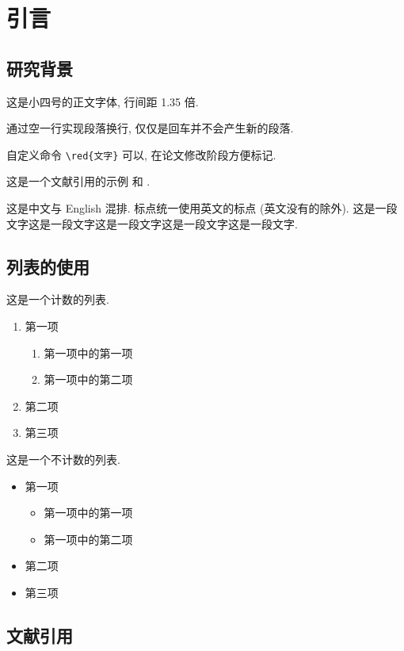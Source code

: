 

\section{引言}

\subsection{研究背景}

这是小四号的正文字体, 行间距 1.35 倍.

通过空一行实现段落换行, 仅仅是回车并不会产生新的段落.

自定义命令 \verb|\red{文字}| 可以, 在论文修改阶段方便标记.

这是一个文献引用的示例 \cite{Tadmor2012} 和 \cite{LiLiu1997,Adams2003,TreWei2014}.

这是中文与 English 混排. 标点统一使用英文的标点 (英文没有的除外). 这是一段文字这是一段文字这是一段文字这是一段文字这是一段文字.


\subsection{列表的使用}

这是一个计数的列表.
\begin{enumerate}%
	\item 第一项
		\begin{enumerate}
			\item 第一项中的第一项
			\item 第一项中的第二项
		\end{enumerate}
	\item 第二项
	\item 第三项
\end{enumerate}

这是一个不计数的列表.
\begin{itemize}%
	\item 第一项
	\begin{itemize}
		\item 第一项中的第一项
		\item 第一项中的第二项
	\end{itemize}
	\item 第二项
	\item 第三项
\end{itemize}


\subsection{文献引用}

